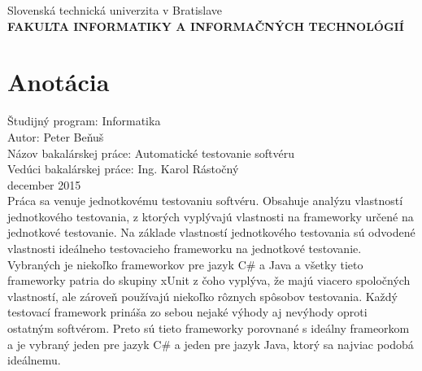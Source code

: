 \documentclass[11pt,twoside,slovak,a4paper]{article}
\begin{document}
	
	\begin{titlepage}
		\begin{center}
			\large 		Slovenská technická univerzita v Bratislave\\
			\textbf{\MakeUppercase{Fakulta informatiky a informačných technológií}}\\
			\hrulefill
		\end{center}
		\section*{Anotácia}
		Študijný program: Informatika\\
		Autor: Peter Beňuš\\
		Názov bakalárskej práce: Automatické testovanie softvéru \\
		Vedúci bakalárskej práce: Ing. Karol Rástočný\\
		december 2015\\
		Práca sa venuje jednotkovému testovaniu softvéru. Obsahuje analýzu vlastností jednotkového testovania, z ktorých vyplývajú vlastnosti na frameworky určené na jednotkové testovanie. Na základe vlastností jednotkového testovania sú odvodené vlastnosti ideálneho testovacieho frameworku na jednotkové testovanie. Vybraných je niekoľko frameworkov pre jazyk C\# a Java a všetky tieto frameworky patria do skupiny xUnit z čoho vyplýva, že majú viacero spoločných vlastností, ale zároveň používajú niekoľko rôznych spôsobov testovania. Každý testovací framework prináša zo sebou nejaké výhody aj nevýhody oproti ostatným softvérom. Preto sú tieto frameworky porovnané s ideálny frameorkom a je vybraný jeden pre jazyk C\# a jeden pre jazyk Java, ktorý sa najviac podobá ideálnemu.
	\end{titlepage}
	
\end{document}
